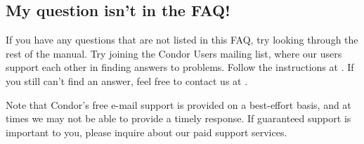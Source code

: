 \subsection*{My question isn't in the FAQ!}

If you have any questions that are not listed in this FAQ, try looking
through the rest of the manual.
Try joining the Condor Users mailing list, where our users
support each other in finding answers to problems.
Follow the instructions at
.
If you still can't find an answer, feel free to contact us at
.

Note that Condor's free e-mail support is provided on a best-effort
basis, and at times we may not be able to provide a timely response.
If guaranteed support is important to you, please inquire about our
paid support services.




